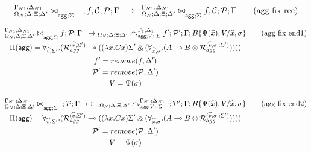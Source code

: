 \[
\trans{
   \fixstatea{\Delta}{\Xi; \Delta'}{\_, f, \lstack{C}; \lstack{P}}{\Gamma}{\Sigma}
}
{
   \fixstatea{\Delta}{\Xi; \Delta'}{f, \lstack{C}; \lstack{P}}{\Gamma}{\Sigma}
} \tag{agg fix rec}
\]

\[
\underset{
   \begin{gathered}
   \Pi(\m{agg}) = \forall_{\widehat{v}, \Sigma'}.
   (\defstwo{agg}{\widehat{v}}{\Sigma'} \lolli ((\lambda x. C x)\Sigma' \with (\forall_{\widehat{x}, \sigma}.
                                                (A \lolli B \otimes
                                                 \defstwo{agg}{\widehat{v}}{\sigma
                                                 ::\Sigma'})))) \\
   f' = remove(f, \Delta') \\
   \lstack{P'} = remove(\lstack{P}, \Delta') \\
   V = \Psi(\sigma)
   \end{gathered}
}
{
   \transx{
      \fixstatea{\Delta}{\Xi; \Delta'}{f; \lstack{P}}{\Gamma}{\Sigma}
   }
   {
      \derstatea{\Delta}{\Xi; \Delta'}{\Gamma_1}{\Delta_1}{V :: \Sigma}{f';
         \lstack{P'}}{B\{\Psi(\widehat{x}), V / \widehat{x}, \sigma \}}
   }
}
   \tag{agg fix end1}
\]

\[
\underset{
   \begin{gathered}
   \Pi(\m{agg}) = \forall_{\widehat{v}, \Sigma'}.
   (\defstwo{agg}{\widehat{v}}{\Sigma'} \lolli ((\lambda x. C x)\Sigma' \with (\forall_{\widehat{x}, \sigma}.
                                                (A \lolli B \otimes
                                                 \defstwo{agg}{\widehat{v}}{\sigma
                                                 ::\Sigma'})))) \\
   \lstack{P'} = remove(\lstack{P}, \Delta') \\
   V = \Psi(\sigma)
   \end{gathered}
}
{
   \trans{
      \fixstatea{\Delta}{\Xi; \Delta'}{\cdot; \lstack{P}}{\Gamma}{\Sigma}
   }
   {
      \derstatea{\Delta}{\Xi, \Delta'}{\Gamma_{N1}}{\Delta_{N1}}{V :: \Sigma}{\cdot;
         \lstack{P}'}{B\{\Psi(\widehat{x}), V / \widehat{x}, \sigma \}}
   }
} \tag{agg fix end2}
\]
